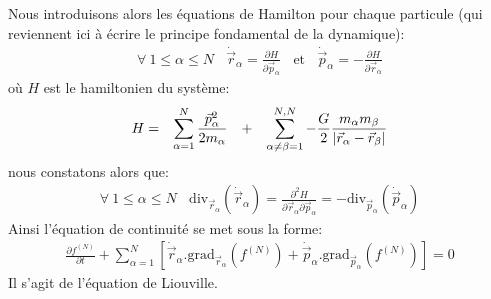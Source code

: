 Nous introduisons alors les équations de Hamilton pour chaque particule (qui reviennent ici à écrire le principe fondamental de la dynamique):
\begin{align*}
	\forall~1\leq\alpha\leq N~~~~\dot{\vec{r}}_{\alpha}=\frac{\partial H}{\partial\vec{p}_{\alpha}}~~~~\text{et}~~~~\dot{\vec{p}}_{\alpha
	}=-\frac{\partial H}{\partial\vec{r}_{\alpha}}
\end{align*}
où $H$ est le hamiltonien du système:
\begin{align*}
	\begin{array}[c]{cccc}
		H= & \displaystyle\sum\limits_{\alpha=1}^{N}\dfrac{\vec{p}_{\alpha}^{2}}{2m_{\alpha}} & + & \displaystyle\sum\limits_{\alpha\neq\beta=1}^{N,N}%
		-\dfrac{G}{2}\dfrac{m_{\alpha}m_{\beta}}{\left\vert \vec{r}_{\alpha}-\vec{r}_{\beta}\right\vert }%
	\end{array}
\end{align*}
nous constatons alors que:
\begin{align*}
	\forall~1\leq\alpha\leq N~~~~\mathrm{div}_{\vec{r}_{\alpha}}\left(\dot{\vec{r}}_{\alpha}\right)  =\frac{\partial^{2}H}{\partial
	\vec{r}_{\alpha}\partial\vec{p}_{\alpha}}=-\mathrm{div}_{\vec{p}_{\alpha}}\left(  \dot{\vec{p}}_{\alpha}\right)
\end{align*}
Ainsi l'équation de continuité se met sous la forme:
\begin{align}
	\frac{\partial f^{(N)}}{\partial t}+\sum_{\alpha=1}^{N}\left[  \dot{\vec{r}}_{\alpha}.\mathrm{grad}_{\vec{r}_{\alpha}}\left(  f^{(N)}\right)
	+\dot{\vec{p}}_{\alpha}.\mathrm{grad}_{\vec{p}_{\alpha}}\left(f^{(N)}\right)  \right]  =0\label{liouville}%
\end{align}
Il s'agit de l'équation de Liouville.

